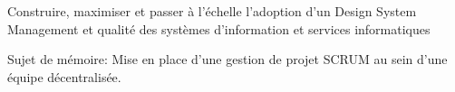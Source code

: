 \documentclass[
	a4paper,
	maincolor=re,
	sidecolor=bg-2,
	sidetextcolor=tex-3,
	sectioncolor=re,
	subsectioncolor=tex-2,
	itemtextcolor=tex-3,
	profilepicsize=3.5cm,
	profilepicborderwidth=2pt,
]{fortysecondscv}
\begin{document}
\begin{cvtable}[1.5]
		{Construire, maximiser et passer à l'échelle l’adoption d’un Design
		System}
		{Management et qualité des systèmes d’information et services informatiques}
\end{cvtable}
\begin{cvtable}[1.5]
		{Sujet de mémoire: Mise en place d'une gestion de projet SCRUM au sein 
        d'une équipe décentralisée.}
\end{cvtable}

\newpage
\makebacksidebar
\end{document}
